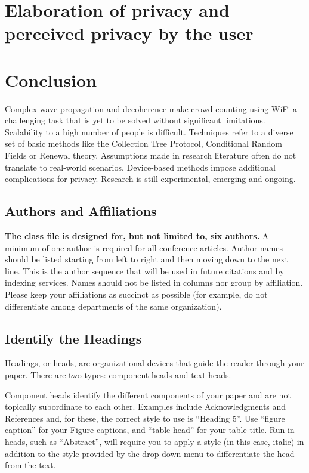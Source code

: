 \documentclass[conference]{IEEEtran}
\begin{document}
\section{Elaboration of privacy and perceived privacy by the user}


\section{Conclusion}
Complex wave propagation and decoherence make crowd counting using WiFi a challenging task that is yet to be solved without significant limitations. Scalability to a high number of people is difficult. Techniques refer to a diverse set of basic methods like the Collection Tree Protocol, Conditional Random Fields or Renewal theory. Assumptions made in research literature often do not translate to real-world scenarios. Device-based methods impose additional complications for privacy. Research is still experimental, emerging and ongoing.



\subsection{Authors and Affiliations}
\textbf{The class file is designed for, but not limited to, six authors.} A 
minimum of one author is required for all conference articles. Author names 
should be listed starting from left to right and then moving down to the 
next line. This is the author sequence that will be used in future citations 
and by indexing services. Names should not be listed in columns nor group by 
affiliation. Please keep your affiliations as succinct as possible (for 
example, do not differentiate among departments of the same organization).

\subsection{Identify the Headings}
Headings, or heads, are organizational devices that guide the reader through 
your paper. There are two types: component heads and text heads.

Component heads identify the different components of your paper and are not 
topically subordinate to each other. Examples include Acknowledgments and 
References and, for these, the correct style to use is ``Heading 5''. Use 
``figure caption'' for your Figure captions, and ``table head'' for your 
table title. Run-in heads, such as ``Abstract'', will require you to apply a 
style (in this case, italic) in addition to the style provided by the drop 
down menu to differentiate the head from the text.
\end{document}
